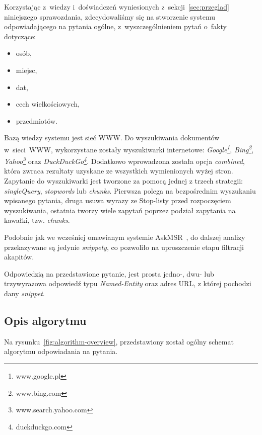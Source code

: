 Korzystając z~wiedzy i~doświadczeń wyniesionych z~sekcji~\ref{sec:przeglad} niniejszego sprawozdania, zdecydowaliśmy się na stworzenie systemu odpowiadającego na pytania ogólne, z~wyszczególnieniem pytań o~fakty dotyczące:
\begin{itemize}
	\item osób,
	\item miejsc,
	\item dat,
	\item cech wielkościowych,
	\item przedmiotów.
\end{itemize}

Bazą wiedzy systemu jest sieć WWW. Do wyszukiwania dokumentów w~sieci~WWW, wykorzystane zostały wyszukiwarki internetowe: \emph{Google\footnote{www.google.pl}}, \emph{Bing\footnote{www.bing.com}}, \emph{Yahoo\footnote{www.search.yahoo.com}} oraz \emph{DuckDuckGo\footnote{duckduckgo.com}}. Dodatkowo wprowadzona została opcja \emph{combined}, która zwraca rezultaty uzyskane ze wszystkich wymienionych wyżej stron. Zapytanie do wyszukiwarki jest tworzone za pomocą jednej z trzech strategii: \emph{singleQuery}, \emph{stopwords} lub \emph{chunks}. Pierwsza polega na bezpośrednim wyszukaniu wpisanego pytania, druga usuwa wyrazy ze Stop-listy przed rozpoczęciem wyszukiwania, ostatnia tworzy wiele zapytań poprzez podział zapytania na kawałki, tzw. \emph{chunks}. 

Podobnie jak we wcześniej omawianym systemie AskMSR~\cite{brill2002analysis}, do dalszej analizy przekazywane są jedynie \emph{snippety}, co pozwoliło na uproszczenie etapu filtracji akapitów. 

Odpowiedzią na przedstawione pytanie, jest prosta jedno-, dwu- lub trzywyrazowa odpowiedź typu \emph{Named-Entity} oraz adres URL, z której pochodzi dany \emph{snippet}. 

\subsection{Opis algorytmu}
Na rysunku~\ref{fig:algorithm-overview}, przedstawiony został ogólny schemat algorytmu odpowiadania na pytania.

